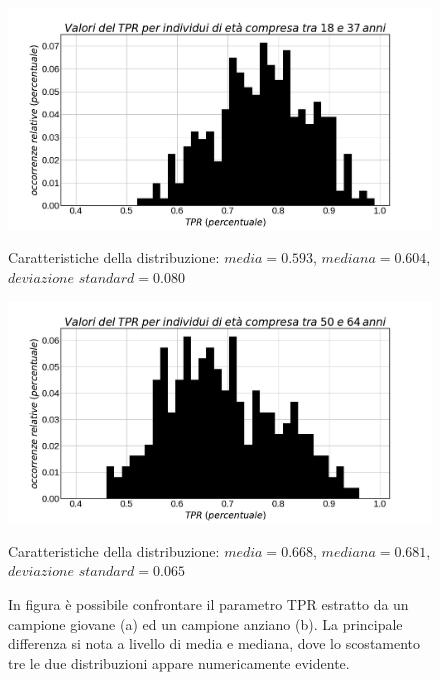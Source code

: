 \documentclass[a4paper, 12pt]{book}
\begin{document}
\begin{figure}[htbp]
\centering
\begin{minipage}[c]{.5\textwidth}
\centering%
\includegraphics[width=\textwidth]{TPR-y.jpg}
\caption{Caratteristiche della distribuzione: $media=0.593$, $mediana=0.604$, $deviazione$ $standard = 0.080$}
\end{minipage}%
\hspace{10mm}%
\begin{minipage}[c]{.5\textwidth}
\centering%
\includegraphics[width=\textwidth]{TPR-o.jpg}
\caption{Caratteristiche della distribuzione: $media=0.668$, $mediana=0.681$, $deviazione$ $standard = 0.065$}
\end{minipage}
\caption{In figura è possibile confrontare il parametro TPR estratto da un campione giovane (a) ed un campione anziano (b).
    La principale differenza si nota a livello di media e mediana, dove lo scostamento tre le due distribuzioni appare numericamente evidente.
}
\label{fig:TPR}
\end{figure}
\end{document}

